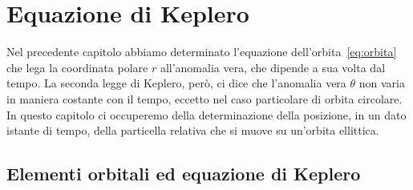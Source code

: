 \cleardoublepage{}
\chapter{Equazione di Keplero}
\label{chap:equazione-keplero}

Nel precedente capitolo abbiamo determinato l'equazione
dell'orbita~\eqref{eq:orbita} che lega la coordinata polare $r$ all'anomalia
vera, che dipende a sua volta dal tempo. La seconda legge di Keplero, però, ci
dice che l'anomalia vera $\theta$ non varia in maniera costante con il tempo,
eccetto nel caso particolare di orbita circolare. In questo capitolo ci
occuperemo della determinazione della posizione, in un dato istante di tempo,
della particella relativa che si muove su un'orbita ellittica.

\section{Elementi orbitali ed equazione di Keplero}
\label{sec:elementi-orbitali}

